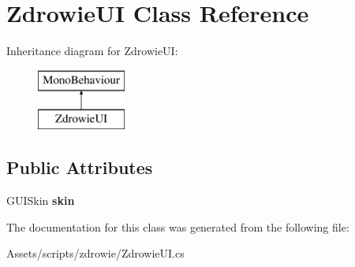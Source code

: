 \hypertarget{class_zdrowie_u_i}{}\section{Zdrowie\+UI Class Reference}
\label{class_zdrowie_u_i}
Inheritance diagram for Zdrowie\+UI\+:\begin{figure}[H]
\begin{center}
\leavevmode
\includegraphics[height=2.000000cm]{class_zdrowie_u_i}
\end{center}
\end{figure}
\subsection*{Public Attributes}
\begin{DoxyCompactItemize}
\item 
\mbox{\label{class_zdrowie_u_i_a8830091d8a564921bfbe90ffeee3c137}} 
G\+U\+I\+Skin {\bfseries skin}
\end{DoxyCompactItemize}


The documentation for this class was generated from the following file\+:\begin{DoxyCompactItemize}
\item 
Assets/scripts/zdrowie/Zdrowie\+U\+I.\+cs\end{DoxyCompactItemize}
